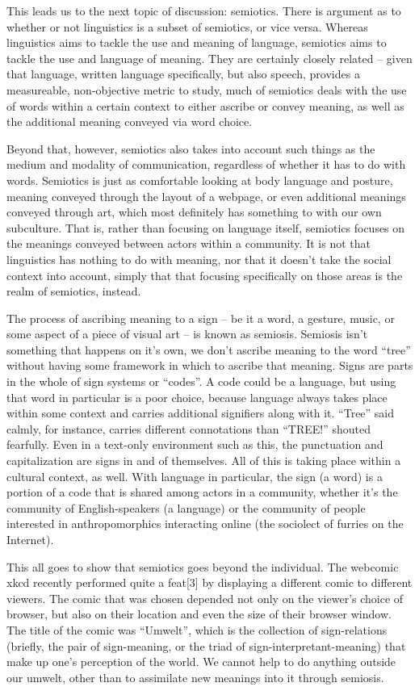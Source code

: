 This leads us to the next topic of discussion: semiotics. There is argument as to whether or not linguistics is a subset of semiotics, or vice versa. Whereas linguistics aims to tackle the use and meaning of language, semiotics aims to tackle the use and language of meaning. They are certainly closely related -- given that language, written language specifically, but also speech, provides a measureable, non-objective metric to study, much of semiotics deals with the use of words within a certain context to either ascribe or convey meaning, as well as the additional meaning conveyed via word choice.

Beyond that, however, semiotics also takes into account such things as the medium and modality of communication, regardless of whether it has to do with words. Semiotics is just as comfortable looking at body language and posture, meaning conveyed through the layout of a webpage, or even additional meanings conveyed through art, which most definitely has something to with our own subculture. That is, rather than focusing on language itself, semiotics focuses on the meanings conveyed between actors within a community. It is not that linguistics has nothing to do with meaning, nor that it doesn't take the social context into account, simply that that focusing specifically on those areas is the realm of semiotics, instead.

The process of ascribing meaning to a sign -- be it a word, a gesture, music, or some aspect of a piece of visual art -- is known as semiosis. Semiosis isn't something that happens on it's own, we don't ascribe meaning to the word ``tree'' without having some framework in which to ascribe that meaning. Signs are parts in the whole of sign systems or ``codes''. A code could be a language, but using that word in particular is a poor choice, because language always takes place within some context and carries additional signifiers along with it. ``Tree'' said calmly, for instance, carries different connotations than ``TREE!'' shouted fearfully. Even in a text-only environment such as this, the punctuation and capitalization are signs in and of themselves. All of this is taking place within a cultural context, as well. With language in particular, the sign (a word) is a portion of a code that is shared among actors in a community, whether it's the community of English-speakers (a language) or the community of people interested in anthropomorphics interacting online (the sociolect of furries on the Internet).

This all goes to show that semiotics goes beyond the individual. The webcomic xkcd recently performed quite a feat[3] by displaying a different comic to different viewers. The comic that was chosen depended not only on the viewer's choice of browser, but also on their location and even the size of their browser window. The title of the comic was ``Umwelt'', which is the collection of sign-relations (briefly, the pair of sign-meaning, or the triad of sign-interpretant-meaning) that make up one's perception of the world. We cannot help to do anything outside our umwelt, other than to assimilate new meanings into it through semiosis.

